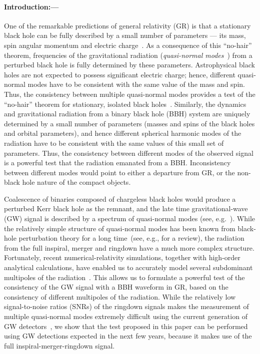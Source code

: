 \documentclass[prl,preprintnumbers,twocolumn,eqsecnum,floatfix,a4paper,nofootinbib,superscriptaddress]{revtex4}
\begin{document}
\paragraph{Introduction:---}

One of the remarkable predictions of general relativity (GR) is that a stationary black hole can be fully described by a small number of parameters --- its mass, spin angular momentum and electric charge~\cite{Israel:1967,Israel:1968,Carter:1978}. As a consequence of this ``no-hair'' theorem, frequencies of the gravitational radiation (\emph{quasi-normal modes}~\cite{Vishveshwara:1970zz,Press:1971wr,Chandrasekhar:1975zza}) from a perturbed black hole is fully determined by these parameters. Astrophysical black holes are not expected to possess significant electric charge; hence, different quasi-normal modes have to be consistent with the same value of the mass and spin. Thus, the consistency between multiple quasi-normal modes provides a test of the ``no-hair'' theorem for stationary, isolated black holes~\cite{Dreyer:2003bv}. Similarly, the dynamics and gravitational radiation from a binary black hole (BBH) system are uniquely determined by a small number of parameters (masses and spins of the black holes and orbital parameters), and hence different spherical harmonic modes of the radiation have to be consistent with the same values of this small set of parameters. Thus, the consistency between different modes of the observed signal is a powerful test that the radiation emanated from a BBH. Inconsistency between different modes would point to either a departure from GR, or the non-black hole nature of the compact objects. 

Coalescence of binaries composed of chargeless black holes would produce a perturbed Kerr black hole as the remnant, and the late time gravitational-wave (GW) signal is described by a spectrum of quasi-normal modes (see, e.g.~\cite{Buonanno:2006ui}). While the relatively simple structure of quasi-normal modes has been known from black-hole perturbation theory for a long time~(see, e.g., \cite{Berti:2009kk} for a review), the radiation from the full inspiral, merger and ringdown have a much more complex structure. Fortunately, recent numerical-relativity simulations, together with high-order analytical calculations, have enabled us to accurately model several subdominant multipoles of the radiation~\cite{Pan:2011gk,London:2017bcn,Mehta:2017jpq}. This allows us to formulate a powerful test of the consistency of the GW signal with a BBH waveform in GR, based on the consistency of different multipoles of the radiation. While the relatively low signal-to-noise ratios (SNRs) of the ringdown signals makes the measurement of multiple quasi-normal modes extremely difficult using the current generation of GW detectors~\cite{Berti:2016lat}, we show that the test proposed in this paper can be performed using GW detections expected in the next few years, because it makes use of the full inspiral-merger-ringdown signal. 
\end{document}
